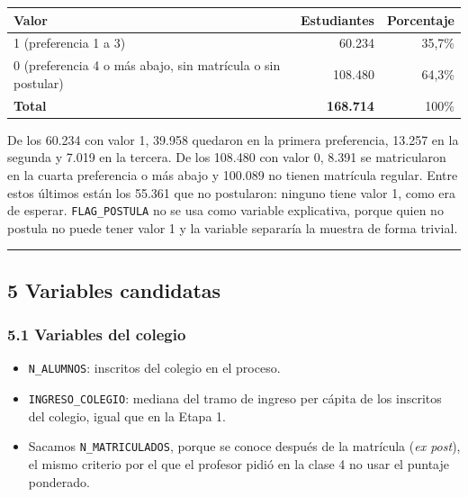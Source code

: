 \documentclass[11pt]{article}
\begin{document}
\begin{center}
\begin{tabular}{lrr}
\toprule
\textbf{Valor} & \textbf{Estudiantes} & \textbf{Porcentaje} \\
\midrule
1 (preferencia 1 a 3)                                     & 60.234  & 35,7\% \\
0 (preferencia 4 o más abajo, sin matrícula o sin postular) & 108.480 & 64,3\% \\
\midrule
\textbf{Total} & \textbf{168.714} & 100\% \\
\bottomrule
\end{tabular}
\end{center}

De los 60.234 con valor 1, 39.958 quedaron en la primera preferencia,
13.257 en la segunda y 7.019 en la tercera. De los 108.480 con valor 0,
8.391 se matricularon en la cuarta preferencia o más abajo y 100.089 no
tienen matrícula regular. Entre estos últimos están los 55.361 que no
postularon: ninguno tiene valor 1, como era de esperar.
\texttt{FLAG\_POSTULA} no se usa como variable explicativa, porque quien
no postula no puede tener valor 1 y la variable separaría la muestra de
forma trivial.

\medskip\hrule\medskip

\subsection*{5 \; Variables candidatas}

\subsubsection*{5.1 \; Variables del colegio}

\begin{itemize}[leftmargin=1.5em, itemsep=0.3em]
  \item \texttt{N\_ALUMNOS}: inscritos del colegio en el proceso.
  \item \texttt{INGRESO\_COLEGIO}: mediana del tramo de ingreso per
        cápita de los inscritos del colegio, igual que en la Etapa 1.
  \item Sacamos \texttt{N\_MATRICULADOS}, porque se conoce después de
        la matrícula (\textit{ex post}), el mismo criterio por el que el
        profesor pidió en la clase 4 no usar el puntaje ponderado.
\end{itemize}
\end{document}
